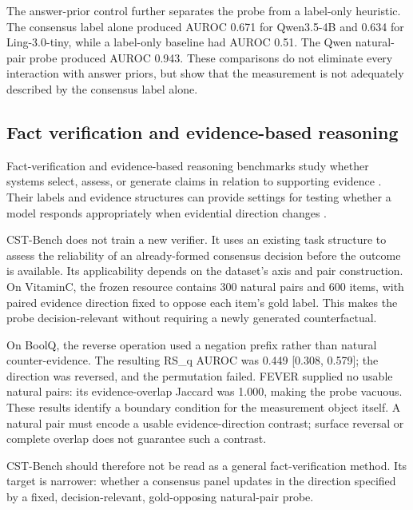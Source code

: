 \documentclass[11pt]{article}
\begin{document}
The answer-prior control further separates the probe from a label-only heuristic. The consensus label alone produced AUROC 0.671 for Qwen3.5-4B and 0.634 for Ling-3.0-tiny, while a label-only baseline had AUROC 0.51. The Qwen natural-pair probe produced AUROC 0.943. These comparisons do not eliminate every interaction with answer priors, but show that the measurement is not adequately described by the consensus label alone.

\subsection{Fact verification and evidence-based reasoning}

Fact-verification and evidence-based reasoning benchmarks study whether systems select, assess, or generate claims in relation to supporting evidence \citep{thorne-etal-2018-fever,wadden-etal-2020-fact,schuster-etal-2021-get}. Their labels and evidence structures can provide settings for testing whether a model responds appropriately when evidential direction changes \citep{schuster-etal-2021-get,thorne-etal-2018-fever,kaushik-etal-2019-counterfactually-augmented}.

CST-Bench does not train a new verifier. It uses an existing task structure to assess the reliability of an already-formed consensus decision before the outcome is available. Its applicability depends on the dataset's axis and pair construction. On VitaminC, the frozen resource contains 300 natural pairs and 600 items, with paired evidence direction fixed to oppose each item's gold label. This makes the probe decision-relevant without requiring a newly generated counterfactual.

On BoolQ, the reverse operation used a negation prefix rather than natural counter-evidence. The resulting RS\_\allowbreak{}q AUROC was 0.449 [0.308, 0.579]; the direction was reversed, and the permutation failed. FEVER supplied no usable natural pairs: its evidence-overlap Jaccard was 1.000, making the probe vacuous. These results identify a boundary condition for the measurement object itself. A natural pair must encode a usable evidence-direction contrast; surface reversal or complete overlap does not guarantee such a contrast.

CST-Bench should therefore not be read as a general fact-verification method. Its target is narrower: whether a consensus panel updates in the direction specified by a fixed, decision-relevant, gold-opposing natural-pair probe.
\end{document}
